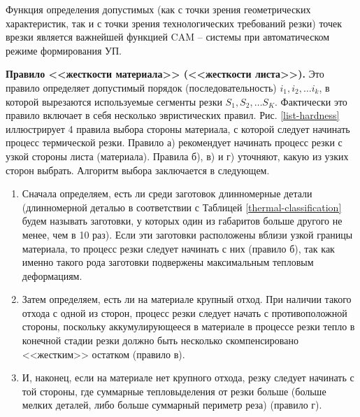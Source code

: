 \documentclass[11pt,twoside]{report}
\begin{document}
Функция определения допустимых
(как с точки зрения геометрических характеристик,
так и с точки зрения технологических требований резки)
точек врезки является важнейшей функцией CAM – системы
при автоматическом режиме формирования УП.

{\bf Правило <<жесткости материала>> (<<жесткости листа>>).}
Это правило определяет допустимый порядок
(последовательность)
$i_1, i_2, \dots i_k$,
в которой вырезаются используемые сегменты резки
$S_1, S_2, \dots S_K$.
Фактически это правило включает в себя несколько эвристических правил.
Рис. \ref{list-hardness}
иллюстрирует 4 правила выбора стороны материала,
с которой следует начинать процесс термической резки.
Правило а) рекомендует начинать процесс резки с узкой стороны листа (материала).
Правила б), в) и г) уточняют,
какую из узких сторон выбрать.
Алгоритм выбора заключается в следующем.

\begin{enumerate}
  \item
  Сначала определяем,
  есть ли среди заготовок длинномерные детали
  (длинномерной деталью в соответствии с Таблицей \ref{thermal-classification}
  будем называть заготовки, у которых один из габаритов больше другого не менее,
  чем в 10 раз).
  Если эти заготовки расположены вблизи
  узкой границы материала,
  то процесс резки следует начинать с них
  (правило б),
  так как именно такого рода заготовки
  подвержены максимальным тепловым деформациям.
  \item
  Затем определяем,
  есть ли на материале крупный отход.
  При наличии такого отхода с одной из сторон,
  процесс резки следует начать с противоположной стороны,
  поскольку аккумулирующееся в материале в процессе резки
  тепло в конечной стадии резки должно быть
  несколько скомпенсировано <<жестким>> остатком
  (правило в).
  \item
  И, наконец,
  если на материале нет крупного отхода,
  резку следует начинать с той стороны,
  где суммарные тепловыделения от резки больше
  (больше мелких деталей, либо больше суммарный периметр реза)
  (правило г).
\end{enumerate}
\end{document}

